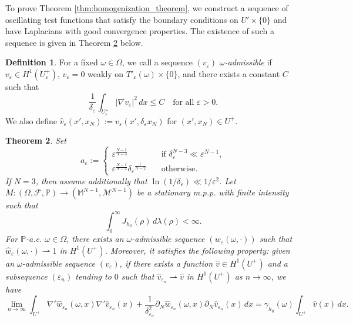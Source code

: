 \documentclass{article}
\numberwithin{equation}{section}
\newtheorem{theorem}{Theorem}[section]
\theoremstyle{definition}
\newtheorem{definition}[theorem]{Definition}
\theoremstyle{remark}
\begin{document}
To prove Theorem \ref{thm:homogenization_theorem}, we construct a sequence of oscillating test functions that satisfy the boundary conditions on $U' \times \{0\}$ and have Laplacians with good convergence properties. The existence of such a sequence is given in Theorem \ref{thm:oscillating_test_functions} below.

\begin{definition} \label{def:omega_admissible}
    For a fixed $\omega \in \Omega$, we call a sequence $(v_\varepsilon)$ \textit{$\omega$-admissible} if $v_\varepsilon \in H^1(U_\varepsilon^+)$, $v_\varepsilon = 0$ weakly on $T'_\varepsilon(\omega) \times \{0\}$, and there exists a constant $C$ such that
    \[
    \frac{1}{\delta_\varepsilon}\int_{U_\varepsilon^+} |\nabla v_\varepsilon|^2 \, dx \le C \quad \text{for all } \varepsilon > 0.
    \]
    We also define $\hat{v}_\varepsilon(x', x_N) := v_\varepsilon(x', \delta_\varepsilon x_N)$ for $(x', x_N) \in U^+$.
        
\end{definition}

\begin{theorem} \label{thm:oscillating_test_functions}
    Set
    \[
    a_\varepsilon :=
    \begin{cases}
        \varepsilon^\frac{N - 1}{N - 3} \quad &\text{if } \delta_\varepsilon^{N - 3} \ll \varepsilon^{N - 1}, \\
        \varepsilon^\frac{N - 1}{N - 2} {\delta_\varepsilon}^\frac{1}{N - 2} \quad &\text{otherwise}.
    \end{cases}
    \]
    If $N = 3$, then assume additionally that $\ln(1/\delta_\varepsilon) \ll 1/\varepsilon^2$. Let $M : (\Omega, \mathcal{F}, \mathbb{P}) \rightarrow (\mathbb{M}^{N - 1}, \mathcal{M}^{N - 1})$ be a stationary m.p.p. with finite intensity such that
    \[
    \int_0^\infty J_{h_0}(\rho) \, d\lambda(\rho) < \infty.
    \]
    For $\mathbb{P}$-a.e. $\omega \in \Omega$, there exists an $\omega$-admissible sequence $(w_\varepsilon(\omega, \cdot))$ such that $\hat{w}_\varepsilon(\omega, \cdot) \rightharpoonup 1$ in $H^1(U^+)$. Moreover, it satisfies the following property: given an $\omega$-admissible sequence $(v_\varepsilon)$, if there exists a function $\hat{v} \in H^1(U^+)$ and a subsequence $(\varepsilon_n)$ tending to $0$ such that $\hat{v}_{\varepsilon_n} \rightharpoonup \hat{v}$ in $H^1(U^+)$ as $n \to \infty$, we have
    \begin{equation} \label{eq:good_laplacians}
        \lim_{n \to \infty} \int_{U^+} \nabla' \hat{w}_{\varepsilon_n}(\omega, x) \nabla' \hat{v}_{\varepsilon_n}(x) + \frac{1}{\delta_{\varepsilon_n}^2} \partial_N \hat{w}_{\varepsilon_n}(\omega, x) \partial_N \hat{v}_{\varepsilon_n}(x) \, dx = \gamma_{h_0}(\omega) \int_{U^+} \hat{v}(x) \, dx.
    \end{equation}
\end{theorem}
\end{document}
